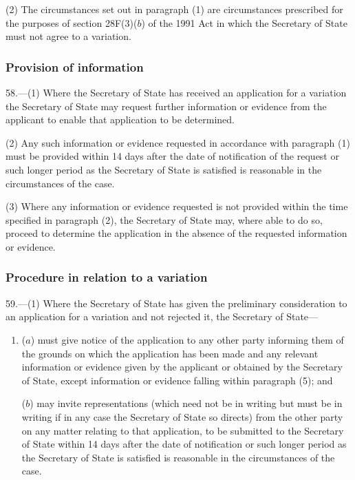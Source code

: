 \documentclass[12pt,a4paper]{article}
\begin{document}
(2) The circumstances set out in paragraph (1) are circumstances prescribed for the purposes of section 28F(3)($b$)  of the 1991 Act in which the Secretary of State must not agree to a variation.

\subsubsection[58. Provision of information]{Provision of information}

58.---(1)  Where the Secretary of State has received an application for a variation the Secretary of State may request further information or evidence from the applicant to enable that application to be determined.

(2) Any such information or evidence requested in accordance with paragraph (1) must be provided within 14 days after the date of notification of the request or such longer period as the Secretary of State is satisfied is reasonable in the circumstances of the case.

(3) Where any information or evidence requested is not provided within the time specified in paragraph (2), the Secretary of State may, where able to do so, proceed to determine the application in the absence of the requested information or evidence.

\subsubsection[59. Procedure in relation to a variation]{Procedure in relation to a variation
}

59.---(1)  Where the Secretary of State has given the preliminary consideration to an application for a variation and not rejected it, the Secretary of State—
\begin{enumerate}\item[]
($a$) must give notice of the application to any other party informing them of the grounds on which the application has been made and any relevant information or evidence given by the applicant or obtained by the Secretary of State, except information or evidence falling within paragraph (5); and

($b$) may invite representations (which need not be in writing but must be in writing if in any case the Secretary of State so directs) from the other party on any matter relating to that application, to be submitted to the Secretary of State within 14 days after the date of notification or such longer period as the Secretary of State is satisfied is reasonable in the circumstances of the case.
\end{enumerate}
\end{document}
